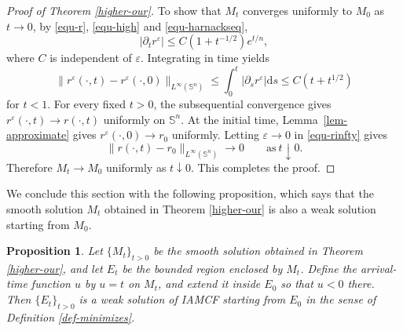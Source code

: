 \documentclass[10pt,a4paper]{amsart}
\newtheorem{proposition}{Proposition}[section]
\numberwithin{equation}{section}
\begin{document}
\begin{proof}[Proof of Theorem \ref{higher-our}]
		
		 To show that $M_t$ converges uniformly to $M_0$ as $t\to 0$, by \eqref{equ-r}, \eqref{equ-high} and \eqref{equ-harnackseq},
		\begin{equation*}
			|\partial_t r^{\varepsilon}|\leq C(1+t^{-1/2})e^{t/n},
		\end{equation*}
		where $C$ is independent of $\varepsilon$. Integrating in time yields
		\begin{equation}
			\label{equ-rinfty}
			\|r^{\varepsilon}(\cdot,t)-r^{\varepsilon}(\cdot,0)\|_{L^\infty(\mathbb{S}^n)}\leq \int_0^t |\partial_s r^{\varepsilon}|\mathrm{d}s \leq C(t+t^{1/2})
		\end{equation}
		for $t<1$. For every fixed $t>0$, the subsequential convergence gives $r^{\varepsilon}(\cdot,t)\to r(\cdot,t)$ uniformly on $\mathbb S^n$. At the initial time, Lemma~\ref{lem-approximate} gives $r^{\varepsilon}(\cdot,0)\to r_0$ uniformly. Letting $\varepsilon\to 0$ in \eqref{equ-rinfty} gives
		\begin{equation*}
			\|r(\cdot,t)-r_0\|_{L^\infty(\mathbb S^n)}\to 0 \qquad\text{as}\ t \downarrow 0.
		\end{equation*}
		Therefore $M_t\to M_0$ uniformly as $t\downarrow 0$. This completes the proof.
        \end{proof}


We conclude this section with the following proposition, which says that the smooth solution $M_t$ obtained in Theorem \ref{higher-our} is also a weak solution starting from $M_0$. 
\begin{proposition}
	\label{prop:smooth-continuation-weak}
	Let $\{M_t\}_{t>0}$ be the smooth solution obtained in Theorem \ref{higher-our}, and let $E_t$ be the bounded region enclosed by $M_t$. Define the arrival-time function $u$ by $u=t$ on $M_t$, and extend it inside $E_0$ so that $u<0$ there. Then $\{E_t\}_{t>0}$ is a weak solution of IAMCF starting from $E_0$ in the sense of Definition \ref{def-minimizes}.
\end{proposition}
\end{document}
